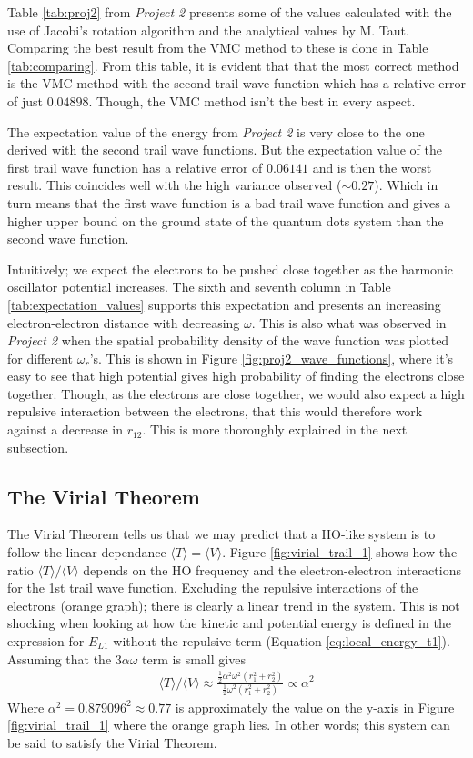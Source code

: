\documentclass[12pt,english,a4paper]{article}
\begin{document}
Table \ref{tab:proj2} from \textit{Project 2} presents some of the values calculated with the use of Jacobi's rotation algorithm and the analytical values by M. Taut. Comparing the best result from the VMC method to these is done in Table \ref{tab:comparing}. From this table, it is evident that that the most correct method is the VMC method with the second trail wave function which has a relative error of just $0.04898$. Though, the VMC method isn't the best in every aspect.

The expectation value of the energy from \textit{Project 2} is very close to the one derived with the second trail wave functions. But the expectation value of the first trail wave function has a relative error of $0.06141$ and is then the worst result. This coincides well with the high variance observed ($\sim 0.27$). Which in turn means that the first wave function is a bad trail wave function and gives a higher upper bound on the ground state of the quantum dots system than the second wave function.

Intuitively; we expect the electrons to be pushed close together as the harmonic oscillator potential increases. The sixth and seventh column in Table \ref{tab:expectation_values} supports this expectation and presents an increasing electron-electron distance with decreasing $\omega$. This is also what was observed in \textit{Project 2} when the spatial probability density of the wave function was plotted for different $\omega_r$'s. This is shown in Figure \ref{fig:proj2_wave_functions}, where it's easy to see that high potential gives high probability of finding the electrons close together. Though, as the electrons are close together, we would also expect a high repulsive interaction between the electrons, that this would therefore work against a decrease in $r_{12}$. This is more thoroughly explained in the next subsection. 

\subsection{The Virial Theorem} \label{section:discussion:virial}
The Virial Theorem tells us that we may predict that a HO-like system is to follow the linear dependance $\langle T\rangle = \langle V\rangle$. Figure \ref{fig:virial_trail_1} shows how the ratio $\langle T\rangle /\langle V\rangle$ depends on the HO frequency and the electron-electron interactions for the 1st trail wave function. Excluding the repulsive interactions of the electrons (orange graph); there is clearly a linear trend in the system. This is not shocking when looking at how the kinetic and potential energy is defined in the expression for $E_{L1}$ without the repulsive term (Equation \eqref{eq:local_energy_t1}). Assuming that the $3\alpha\omega$ term is small gives
\begin{align*}
    \langle T\rangle /\langle V\rangle \approx \frac{\frac{1}{2}\alpha^2\omega^2\left(r_1^2+r_2^2\right)}{\frac{1}{2}\omega^2\left(r_1^2+r_2^2\right)} \propto \alpha^2
\end{align*}
Where $\alpha^2=0.879096^2\approx 0.77$ is approximately the value on the y-axis in Figure \ref{fig:virial_trail_1} where the orange graph lies. In other words; this system can be said to satisfy the Virial Theorem.
\end{document}
